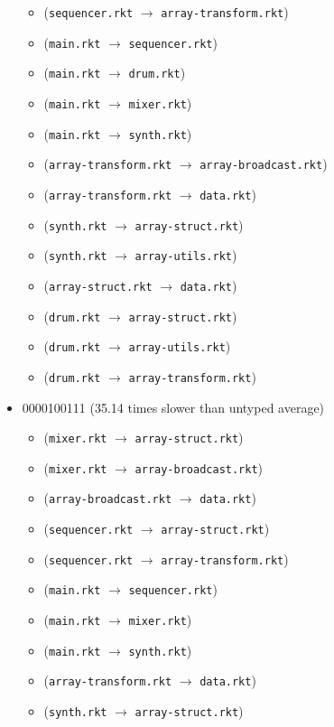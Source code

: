\documentclass{article}
\newcommand{\mono}[1]{\texttt{#1}}
\begin{document}
\begin{itemize}
\begin{itemize}
  \item (\mono{sequencer.rkt} $\rightarrow$ \mono{array-transform.rkt})
  \item (\mono{main.rkt} $\rightarrow$ \mono{sequencer.rkt})
  \item (\mono{main.rkt} $\rightarrow$ \mono{drum.rkt})
  \item (\mono{main.rkt} $\rightarrow$ \mono{mixer.rkt})
  \item (\mono{main.rkt} $\rightarrow$ \mono{synth.rkt})
  \item (\mono{array-transform.rkt} $\rightarrow$ \mono{array-broadcast.rkt})
  \item (\mono{array-transform.rkt} $\rightarrow$ \mono{data.rkt})
  \item (\mono{synth.rkt} $\rightarrow$ \mono{array-struct.rkt})
  \item (\mono{synth.rkt} $\rightarrow$ \mono{array-utils.rkt})
  \item (\mono{array-struct.rkt} $\rightarrow$ \mono{data.rkt})
  \item (\mono{drum.rkt} $\rightarrow$ \mono{array-struct.rkt})
  \item (\mono{drum.rkt} $\rightarrow$ \mono{array-utils.rkt})
  \item (\mono{drum.rkt} $\rightarrow$ \mono{array-transform.rkt})
  \end{itemize}
\item 0000100111 (35.14 times slower than untyped average)
  \begin{itemize}
  \item (\mono{mixer.rkt} $\rightarrow$ \mono{array-struct.rkt})
  \item (\mono{mixer.rkt} $\rightarrow$ \mono{array-broadcast.rkt})
  \item (\mono{array-broadcast.rkt} $\rightarrow$ \mono{data.rkt})
  \item (\mono{sequencer.rkt} $\rightarrow$ \mono{array-struct.rkt})
  \item (\mono{sequencer.rkt} $\rightarrow$ \mono{array-transform.rkt})
  \item (\mono{main.rkt} $\rightarrow$ \mono{sequencer.rkt})
  \item (\mono{main.rkt} $\rightarrow$ \mono{mixer.rkt})
  \item (\mono{main.rkt} $\rightarrow$ \mono{synth.rkt})
  \item (\mono{array-transform.rkt} $\rightarrow$ \mono{data.rkt})
  \item (\mono{synth.rkt} $\rightarrow$ \mono{array-struct.rkt})

\end{itemize}
\end{itemize}
\end{document}
